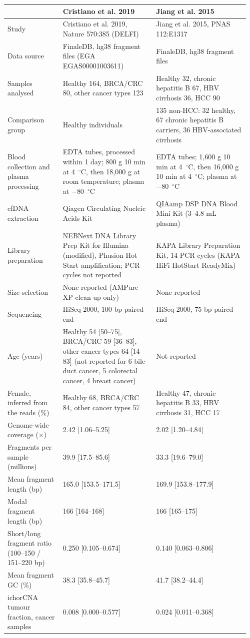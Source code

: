 \begin{tabular}{p{0.22\linewidth}p{0.37\linewidth}p{0.37\linewidth}}
\hline
 & Cristiano et al. 2019 & Jiang et al. 2015 \\
\hline
Study & Cristiano et al. 2019, Nature 570:385 (DELFI) & Jiang et al. 2015, PNAS 112:E1317 \\
Data source & FinaleDB, hg38 fragment files (EGA EGAS00001003611) & FinaleDB, hg38 fragment files \\
Samples analysed & Healthy 164, BRCA/CRC 80, other cancer types 123 & Healthy 32, chronic hepatitis B 67, HBV cirrhosis 36, HCC 90 \\
Comparison group & Healthy individuals & 135 non-HCC: 32 healthy, 67 chronic hepatitis B carriers, 36 HBV-associated cirrhosis \\
Blood collection and plasma processing & EDTA tubes, processed within 1 day; 800 g 10 min at 4~$^\circ$C, then 18,000 g at room temperature; plasma at $-$80~$^\circ$C & EDTA tubes; 1,600 g 10 min at 4~$^\circ$C, then 16,000 g 10 min at 4~$^\circ$C; plasma at $-$80~$^\circ$C \\
cfDNA extraction & Qiagen Circulating Nucleic Acids Kit & QIAamp DSP DNA Blood Mini Kit (3--4.8 mL plasma) \\
Library preparation & NEBNext DNA Library Prep Kit for Illumina (modified), Phusion Hot Start amplification; PCR cycles not reported & KAPA Library Preparation Kit, 14 PCR cycles (KAPA HiFi HotStart ReadyMix) \\
Size selection & None reported (AMPure XP clean-up only) & None reported \\
Sequencing & HiSeq 2000, 100 bp paired-end & HiSeq 2000, 75 bp paired-end \\
Age (years) & Healthy 54 [50--75], BRCA/CRC 59 [36--83], other cancer types 64 [14--83] (not reported for 6 bile duct cancer, 5 colorectal cancer, 4 breast cancer) & Not reported \\
Female, inferred from the reads (\%) & Healthy 68, BRCA/CRC 84, other cancer types 57 & Healthy 47, chronic hepatitis B 33, HBV cirrhosis 31, HCC 17 \\
Genome-wide coverage ($\times$) & 2.42 [1.06--5.25] & 2.02 [1.20--4.84] \\
Fragments per sample (millions) & 39.9 [17.5--85.6] & 33.3 [19.6--79.0] \\
Mean fragment length (bp) & 165.0 [153.5--171.5] & 169.9 [153.8--177.9] \\
Modal fragment length (bp) & 166 [164--168] & 166 [165--175] \\
Short/long fragment ratio (100--150 / 151--220 bp) & 0.250 [0.105--0.674] & 0.140 [0.063--0.806] \\
Mean fragment GC (\%) & 38.3 [35.8--45.7] & 41.7 [38.2--44.4] \\
ichorCNA tumour fraction, cancer samples & 0.008 [0.000--0.577] & 0.024 [0.011--0.368] \\
\hline
\end{tabular}

